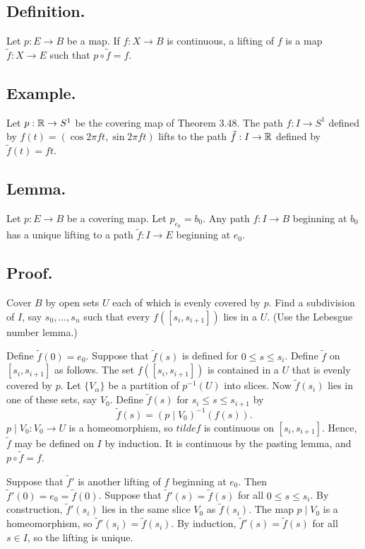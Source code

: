 \documentclass[titlepage]{article}
\begin{document}
\subsection{Definition.} Let $p: E \to B$ be a map. If $f: X \to B$ is continuous, a lifting of $f$ is a map $\tilde{f}: X \to E$ such that $p \circ \tilde{f} = f$.

\subsection{Example.} Let $p: \mathbb{R} \to S^{1}$ be the covering map of Theorem 3.48. The path $f: I \to S^{1}$ defined by $f(t) = (\cos 2\pi ft, \sin 2\pi ft)$ lifts to the path $\tilde{f}: I \to \mathbb{R}$ defined by $\tilde{f}(t) = ft$.

\subsection{Lemma.} Let $p: E \to B$ be a covering map. Let $p_{e_{0}} = b_{0}$. Any path $f: I \to B$ beginning at $b_{0}$ has a unique lifting to a path $\tilde{f}: I \to E$ beginning at $e_{0}$.

\subsection{Proof.} Cover $B$ by open sets $U$ each of which is evenly covered by $p$.  Find a subdivision of $I$, say $s_{0}, \ldots, s_{n}$ such that every $f([s_{i}, s_{i+1}])$ lies in a $U$. (Use the Lebesgue number lemma.)

Define $\tilde{f}(0) = e_{0}$. Suppose that $\tilde{f}(s)$ is defined for $0 \leq s \leq s_{i}$. Define $\tilde{f}$ on $[s_{i}, s_{i+1}]$ as follows. The set $f([s_{i}, s_{i+1}])$ is contained in a $U$ that is evenly covered by $p$. Let $\{V_{\alpha}\}$ be a partition of $p^{-1}(U)$ into slices. Now $\tilde{f}(s_{i})$ lies in one of these sets, say $V_{0}$. Define $\tilde{f}(s)$ for $s_{i} \leq s \leq s_{i+1}$ by 
$$\tilde{f}(s) = (p \mid V_{0})^{-1}(f(s)).$$
$p \mid V_{0}: V_{0} \to U$ is a homeomorphism, so $tilde{f}$ is continuous on $[s_{i}, s_{i+1}]$. Hence, $\tilde{f}$ may be defined on $I$ by induction. It is continuous by the pasting lemma, and $p \circ \tilde{f} = f$.

Suppose that $\tilde{f}'$ is another lifting of $f$ beginning at $e_{0}$. Then $\tilde{f}'(0) = e_{0} = \tilde{f}(0)$. Suppose that $\tilde{f}'(s) = \tilde{f}(s)$ for all $0 \leq s \leq s_{i}$. By construction, $\tilde{f}'(s_{i})$ lies in the same slice $V_{0}$ as $\tilde{f}(s_{i})$. The map $p \mid V_{0}$ is a homeomorphism, so $\tilde{f}'(s_{i}) = \tilde{f}(s_{i})$. By induction, $\tilde{f}'(s) = \tilde{f}(s)$ for all $s \in I$, so the lifting is unique.
\end{document}
